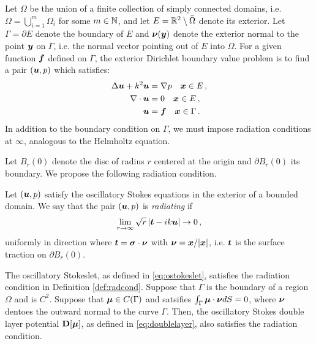 Let $\Omega$ be the union of a finite collection of
simply connected domains, i.e. $\Omega = \bigcup_{i=1}^m \Omega_i$
for some $m \in \mathbb{N}$,
and let $E = \mathbb{R}^{2} \setminus \bar{\Omega}$ denote its
exterior.
%
Let $\Gamma = \partial E$ denote the boundary of $E$ and
${\boldsymbol \nu}({\boldsymbol y})$ denote the exterior normal to the point ${\boldsymbol y}$ on
$\Gamma$, i.e. the normal vector pointing out of $E$ into $\Omega$.
%
For a given function ${\boldsymbol f}$ defined on $\Gamma$,
the exterior Dirichlet boundary value problem is to
find a pair $({\boldsymbol u},p)$ which satisfies:
\begin{equation}
\begin{aligned}
\Delta {\boldsymbol u} + k^{2} {\boldsymbol u} &= \nabla p \quad {\boldsymbol x} \in E \, ,\\
\nabla \cdot {\boldsymbol u} &= 0 \quad {\boldsymbol x} \in E \, ,  \\
{\boldsymbol u} &= {\boldsymbol f} \quad {\boldsymbol x} \in \Gamma \, . \nonumber
\end{aligned}
\end{equation}
In addition to the boundary condition on
$\Gamma$, we must impose radiation conditions
at $\infty$, analogous to the Helmholtz equation.
%

Let $B_r(0)$ denote the disc of radius $r$ centered
at the origin and $\partial B_r(0)$ its boundary.
%
We propose the following radiation condition.

\begin{definition} \label{def:radcond}
Let $({\boldsymbol u},p)$ satisfy the oscillatory Stokes equations in
the exterior of a bounded domain. We say that
the pair $({\boldsymbol u},p)$ is {\em radiating} if
\begin{equation}
\lim_{r\to \infty} \sqrt{r} \left| {\boldsymbol t} - i k {\boldsymbol u} \right| \to 0 \, ,
\label{eq:radcond}
\end{equation}
uniformly in direction where ${\boldsymbol t} = {\boldsymbol \sigma} \cdot {\boldsymbol \nu}$
with ${\boldsymbol \nu} = {\boldsymbol x}/|{\boldsymbol x}|$, i.e. ${\boldsymbol t}$ is the surface
traction on $\partial B_r(0)$.     
\end{definition}

\begin{thrm}
The oscillatory Stokeslet, as defined in \eqref{eq:ostokeslet}, 
satisfies the radiation condition in Definition \ref{def:radcond}.
Suppose that $\Gamma$ is the boundary of a region $\Omega$
and is $C^{2}$. 
Suppose that ${\boldsymbol \mu} \in C(\Gamma)$ and satsifies
$\int_{\Gamma} {\boldsymbol \mu} \cdot {\boldsymbol \nu} dS = 0$, where
${\boldsymbol \nu}$ dentoes the outward normal to the curve $\Gamma$.
Then, the oscillatory Stokes 
double layer potential ${\bf D}[{\boldsymbol \mu}]$, as defined in \eqref{eq:doublelayer},
also satisfies the radiation condition.
\end{thrm}

